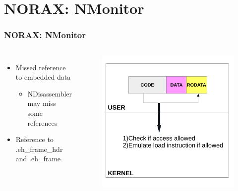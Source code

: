 \documentclass[aspectratio=169]{beamer}
\begin{document}
\section{NORAX: NMonitor}
\begin{frame}
\frametitle{NORAX: NMonitor}
\begin{columns}[c]
\begin{itemize}
\item Missed reference to embedded data
	\begin{itemize}
		\item NDisassembler may miss some references
	\end{itemize}
\item Reference to .eh\_frame\_hdr and .eh\_frame
\end{itemize}
\begin{figure}
\includegraphics[width=1.0\linewidth]{figures/nmonitor.pdf}
\end{figure}
\end{columns}
\end{frame}

\end{document}
